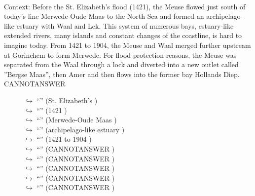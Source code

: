 \documentclass[11pt,a4paper, onecolumn]{article}
\begin{document}
\\ Context: Before the St. Elizabeth's flood (1421), the Meuse flowed just south of today's line Merwede-Oude Maas to the North Sea and formed an archipelago-like estuary with Waal and Lek. This system of numerous bays, estuary-like extended rivers, many islands and constant changes of the coastline, is hard to imagine today. From 1421 to 1904, the Meuse and Waal merged further upstream at Gorinchem to form Merwede. For flood protection reasons, the Meuse was separated from the Waal through a lock and diverted into a new outlet called ''Bergse Maas'', then Amer and then flows into the former bay Hollands Diep. CANNOTANSWER

\begin{figure}[t] \small \begin{tcolorbox}[boxsep=0pt,left=5pt,right=0pt,top=2pt,colback = yellow!5] \begin{dialogue}
 \small 
\colorbox{pink!25}{$\hookrightarrow$}
{ ``'' (St. Elizabeth's ) }
\\
\colorbox{pink!25}{$\hookrightarrow$}
{ ``'' (1421 ) }
\\
\colorbox{pink!25}{$\hookrightarrow$}
{ ``'' (Merwede-Oude Maas ) }
\\
\colorbox{pink!25}{$\hookrightarrow$}
{ ``'' (archipelago-like estuary ) }
\\
\colorbox{pink!25}{$\hookrightarrow$}
{ ``'' (1421 to 1904 ) }
\\
\colorbox{pink!25}{$\hookrightarrow$}
{ ``'' (CANNOTANSWER ) }
\\
\colorbox{pink!25}{$\hookrightarrow$}
{ ``'' (CANNOTANSWER ) }
\\
\colorbox{pink!25}{$\hookrightarrow$}
{ ``'' (CANNOTANSWER ) }
\\
\colorbox{pink!25}{$\hookrightarrow$}
{ ``'' (CANNOTANSWER ) }
\\
\colorbox{pink!25}{$\hookrightarrow$}
{ ``'' (CANNOTANSWER ) }
\\
 \end{dialogue}\end{tcolorbox}\end{figure}
\end{document}
